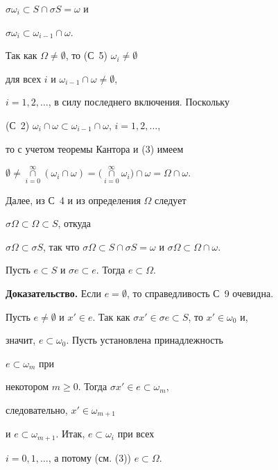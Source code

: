 $\sigma\omega_i\subset S\cap\sigma S=\omega$ и 


$\sigma\omega_i\subset\omega_{i-1}\cap\omega$. 


Так как $\Omega\ne\emptyset$, то (С~5) $\omega_i\ne\emptyset$


для всех $i$ и $\omega_{i-1}\cap\omega\ne\emptyset$, 


$i=1,2,\dotsc$, в силу последнего включения. Поскольку 


(С~2) $\omega_i\cap\omega\subset\omega_{i-1}\cap\omega$, $i=1,2,\dotsc$, 


то с учетом теоремы Кантора и (3) имеем 


$\emptyset\ne\mathop{\cap}\limits^\infty_{i=0} (\omega_i\cap\omega)= 


\Big(\mathop{\cap}\limits^\infty_{i=0}\omega_i\Big)\cap\omega 


=\Omega\cap\omega$. 


Далее, из С~4 и из определения $\Omega$ следует 


$\sigma\Omega\subset\Omega\subset S$, откуда 


$\sigma\Omega\subset\sigma S$, так что $\sigma\Omega\subset S\cap\sigma 


S=\omega$ и $\sigma\Omega\subset\Omega\cap\omega$. 


 


\begin{pty} 


Пусть $e\subset S$ и $\sigma e\subset e$. Тогда $e\subset\Omega$. 


\end{pty} 


 


{\bf Доказательство.} Если $e=\emptyset$, то справедливость С~9 очевидна. 


Пусть $e\ne\emptyset$ и $x'\in e$. Так как $\sigma x'\in\sigma 


e\subset S$, то $x'\in\omega_0$ и, 


значит, $e\subset\omega_0$. Пусть установлена принадлежность 


$e\subset\omega_m$ при 


некотором $m\ge0$. Тогда $\sigma x'\in e\subset\omega_m$, 


следовательно, $x'\in\omega_{m+1}$ 


и $e\subset\omega_{m+1}$. Итак, $e\subset\omega_i$ при всех 


$i=0,1,\dotsc$, а потому (см. (3)) $e\subset\Omega$. 


